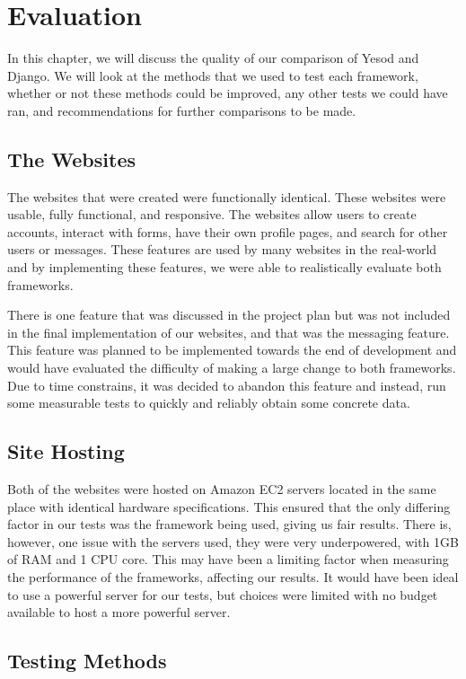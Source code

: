 \chapter{Evaluation}
\label{chap:Evaluation}
In this chapter, we will discuss the quality of our comparison
of Yesod and Django. We will look at the methods that we used
to test each framework, whether or not these methods could
be improved, any other tests we could have ran, and recommendations
for further comparisons to be made.

\section{The Websites}

The websites that were created were functionally identical. These
websites were usable, fully functional, and responsive.
The websites allow users to create accounts, interact with forms,
have their own profile pages, and search for other users or
messages. These features are used by many websites
in the real-world and by implementing these features, we
were able to realistically evaluate both frameworks.

There is one feature that was discussed in the project plan
but was not included in the final implementation of our websites,
and that was the messaging feature. This feature was planned
to be implemented towards the end of development and would
have evaluated the difficulty of making a large change to both
frameworks. Due to time constrains, it was decided to abandon
this feature and instead, run some measurable tests to quickly
and reliably obtain some concrete data.

\section{Site Hosting}

Both of the websites were hosted on Amazon EC2 servers located
in the same place with identical hardware specifications. This
ensured that the only differing factor in our tests was the
framework being used, giving us fair results. There is, however,
one issue with the servers used, they were very underpowered,
with 1GB of RAM and 1 CPU core. This may have been a limiting
factor when measuring the performance of the frameworks, affecting
our results. It would have been ideal to use a powerful server
for our tests, but choices were limited with no budget available
to host a more powerful server.

\section{Testing Methods}

